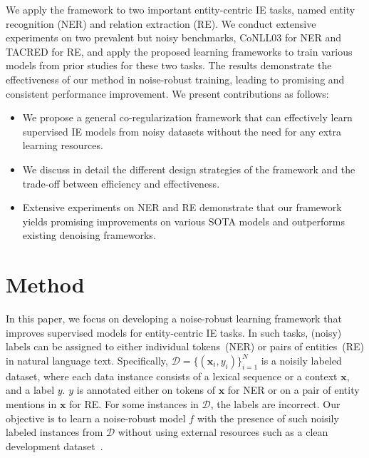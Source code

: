 \documentclass[11pt]{article}
\begin{document}
We apply the framework to two important entity-centric IE tasks, named entity recognition (NER) and relation extraction (RE).
We conduct extensive experiments on two prevalent but noisy benchmarks, CoNLL03 for NER and TACRED for RE, and apply the proposed learning frameworks to train various models from prior studies for these two tasks. 
The results demonstrate the effectiveness of our method in noise-robust training, leading to promising and consistent performance improvement.
We present contributions as follows:
\begin{itemize}[leftmargin=1em]
    \setlength\itemsep{0em}
    \item We propose a general co-regularization framework that can effectively learn supervised IE models from noisy datasets without the need for any extra learning resources.
\item We discuss in detail the different design strategies of the framework and the trade-off between efficiency and effectiveness.
    \item Extensive experiments on NER and RE demonstrate that our framework yields promising improvements on various SOTA models and outperforms existing denoising frameworks.
\end{itemize}

\section{Method}
In this paper, we focus on developing a noise-robust learning framework that improves supervised models for entity-centric IE tasks. 
In such tasks, (noisy) labels can be assigned to either individual tokens~(NER) or pairs of entities~(RE) in natural language text.
Specifically, $\mathcal{D}=\{(\bm{x}_i, y_i)\}_{i=1}^N$ is a noisily labeled dataset, where each data instance consists of a lexical sequence or a context $\bm{x}$, and a label $y$.
$y$ is annotated either on tokens of $\bm{x}$ for NER or on a pair of entity mentions in $\bm{x}$ for RE.
For some instances in $\mathcal{D}$, the labels are incorrect.
Our objective is to learn a noise-robust model $f$ with the presence of such noisily labeled instances from $\mathcal{D}$ without using external resources such as a clean development dataset~\cite{Qin2018RobustDS}.
\end{document}
